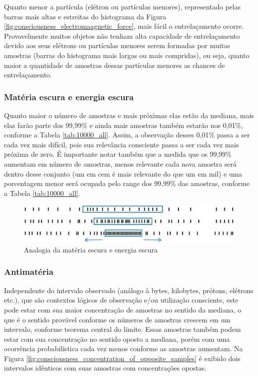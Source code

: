 Quanto menor a partícula (elétron ou partículas menores), representado pelas barras mais altas e estreitas do histograma da Figura \ref{fig:consciousness_electromaagnetic_force}, mais fácil o entrelaçamento ocorre. Provavelmente muitos objetos não tenham alta capacidade de entrelaçamento devido aos seus elétrons ou partículas menores serem formadas por muitas amostras (barras do histograma mais largas ou mais compridas), ou seja, quanto maior a quantidade de amostras dessas partículas menores as chances de entrelaçamento. 




\subsubsection{Matéria escura e energia escura}
Quanto maior o número de amostras e mais próximas elas estão da mediana, mais elas farão parte dos 99,99\% e ainda mais amostras também estarão nos 0,01\%, conforme a Tabela \ref{tab:10000_all}. Assim, a observação desses 0,01\% passa a ser cada vez mais difícil, pois sua relevância consciente passa a ser cada vez mais próxima de zero. É importante notar também que a medida que os 99,99\% aumentam em número de amostras, menos relevante cada nova amostra será dentro desse conjunto (um em cem é mais relevante do que um em mil) e uma porcentagem menor será ocupada pelo range dos 99,99\% das amostras, conforme a Tabela \ref{tab:10000_all}.

\begin{figure}[H]
\caption{Analogia da matéria escura e energia escura}
\label{fig:consciousness_dark_matter_dark_energy}
\centering
\includegraphics[scale=1]{sections/images/consciousness_dark_matter_dark_energy.jpg}
\end{figure}

\subsubsection{Antimatéria}
Independente do intervalo observado (análogo à bytes, kilobytes, prótons, elétrons etc.), que são contextos lógicos de observação e/ou utilização consciente, este pode estar com sua maior concentração de amostras no sentido da mediana, o que é o sentido provável conforme os números de amostras crescem em um intervalo, conforme teorema central do limite. Essas amostras também podem estar com sua concentração no sentido oposto a mediana, porém com uma ocorrência probabilística cada vez menos conforme as amostras aumentam. Na Figura \ref{fig:consciousness_concentration_of_opposite_samples} é exibido dois intervalos idênticos com suas amostras com concentrações opostas.

